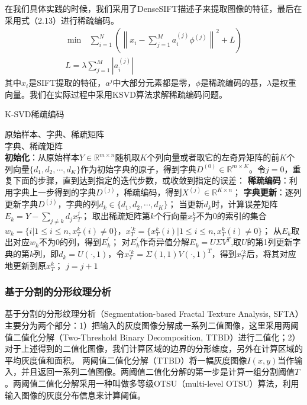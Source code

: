 \documentclass[supercite]{HustGraduPaper}
\begin{document}
\begin{sloppypar}
  在我们具体实践的时候，我们采用了DenseSIFT描述子来提取图像的特征，最后在采用式（2.13）进行稀疏编码。\begin{gather}
   \min\text{  }\sum\limits^N_{i=1}\left( \left\lVert x_i-\sum\limits^M_{j=1} a_i^{(j)}\phi^{(j)} \right\rVert^2+L \right)\\
   L=\lambda\sum\limits^M_{j=1}\left\lvert a_i^{(j)} \right\rvert
  \end{gather}
  其中$x_i$是SIFT提取的特征，$a^j$中大部分元素都是零，$\phi$是稀疏编码的基，$\lambda$是权重向量。我们在实际过程中采用KSVD算法求解稀疏编码问题\cite{CHENG2014416}。
  \begin{algorithm}[H] 
    \caption{K-SVD稀疏编码} 
    \label{alg:Framwork} 
    \begin{algorithmic}[1] %
    \REQUIRE  原始样本、字典、稀疏矩阵\\
    \ENSURE  字典、稀疏矩阵\\
    \STATE \textbf{初始化}：从原始样本$Y\in\mathbb{R}^{m\times n}$随机取$K$个列向量或者取它的左奇异矩阵的前$K$个列向量$\{ d_1,d_2,\cdots,d_K \}$作为初始字典的原子，得到字典$D^{(0)}\in\mathbb{R}^{m\times K}$。令$j=0$，重复下面的步骤，直到达到指定的迭代步数，或收敛到指定的误差：
    \STATE  \textbf{稀疏编码}：利用字典上一步得到的字典$D^{(j)}$，稀疏编码，得到$X^{(j)}\in\mathbb{R}^{K\times n}$；
    \STATE  \textbf{字典更新}：逐列更新字典$D^{(j)}$，字典的列$d_k\in\{ d_1,d_2,\cdots,d_K \}$；
    \STATE  当更新$d_k$时，计算误差矩阵$E_k=Y-\sum_{j\neq k}d_jx^j_T$；
    \STATE  取出稀疏矩阵第$k$个行向量$x^k_T$不为0的索引的集合$w_k=\{ i|1\leq i\leq n,x^k_T(i)\neq 0 \}$，$x^{'k}_T=\{ x^k_T(i)|1\leq i\leq n,x^k_T(i)\neq 0 \}$；
    \STATE 从$E_k$取出对应$w_k$不为0的列，得到$E^{'}_{k}$；
    \STATE 对$E^{'}_{k}$作奇异值分解$E_k=U\Sigma V^T$,取$U$的第1列更新字典的第$k$列，即$d_k=U(\cdot,1)$，令$x^{'k}_T=\Sigma(1,1)V(\cdot,1)^T$，得到$x^{'k}_T$后，将其对应地更新到原$x^k_T$；
    \STATE $j=j+1$
    \end{algorithmic}
  \end{algorithm}
  \subsubsection{基于分割的分形纹理分析}
  基于分割的分形纹理分析（Segmentation-based Fractal Texture Analysis, SFTA）主要分为两个部分\cite{6382737}：1）把输入的灰度图像分解成一系列二值图像，这里采用两阈值二值化分解（Two-Threshold Binary Decomposition, TTBD）进行二值化；2）对于上述得到的二值化图像，我们计算区域的边界的分形维度，另外在计算区域的平均灰度值和面积。
  两阈值二值化分解（TTBD）将一幅灰度图像$I(x,y)$当作输入，并且返回一系列二值图像。两阈值二值化分解的第一步是计算一组分割阈值$T$。两阈值二值化分解采用一种叫做多等级OTSU（multi-level OTSU）算法，利用输入图像的灰度分布信息来计算阈值。


\end{sloppypar}
\end{document}
